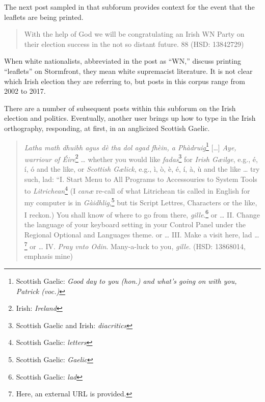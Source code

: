 \documentclass[output=paper,colorlinks,citecolor=brown]{langscibook}
\begin{document}
\noindent The next post sampled in that subforum provides context for the event that the leaflets are being printed.

\begin{quote} 
With the help of God we will be congratulating an Irish WN Party on their election success in the not so distant future. 88 (HSD: 13842729) 
\end{quote}

\noindent When  white nationalists, abbreviated in the post as ``WN,'' discuss printing ``leaf\-lets'' on Stormfront, they mean white supremacist literature. It is not clear which Irish election they are referring to, but posts in this corpus range from 2002 to 2017.

There are a number of subsequent posts within this subforum on the Irish election and politics. Eventually, another user brings up how to type in the Irish orthography, responding, at first, in an anglicized Scottish Gaelic.

\begin{quote}
\emph{Latha math dhuibh agus dè tha dol agad fhèin, a Phàdruig}\footnote{Scottish Gaelic: \emph{Good day to you (hon.) and what's going on with you, Patrick (voc.)}} {[}\ldots{]} \emph{Aye, warriour of Éire}\footnote{Irish: \emph{Ireland}} \ldots{} whether you would like \emph{fadas}\footnote{Scottish Gaelic and Irish: \emph{diacritics}} for \emph{Irish Gæilge}, e.g., é, í, ó and the like, or \emph{Scottish Gælick}, e.g., ì, ò, è, é, í, à, ù and the like \ldots{} try such, lad: ``I. Start Menu to All Programs to Accessouries to System Tools to \emph{Litrichean}\footnote{Scottish Gaelic: \emph{letters}} (I \emph{canæ} re-call of what Litrichean tis called in English for my computer is in \emph{Gàidhlig},\footnote{Scottish Gaelic: \emph{Gaelic}} but tis Script Lettres, Characters or the like, I reckon.) You shall know of where to go from there, \emph{gille}.\footnote{Scottish Gaelic: \emph{lad}} or \ldots{} II. Change the language of your keyboard setting in your Control Panel under the Regional Optional and Languages theme. or \ldots{} III. Make a visit here, lad \ldots{} \footnote{Here, an external URL is provided.} or \ldots{} IV. \emph{Pray vnto Odin}. Many-a-luck to you, \emph{gille}. (HSD: 13868014, emphasis mine) 
\end{quote}
\end{document}
